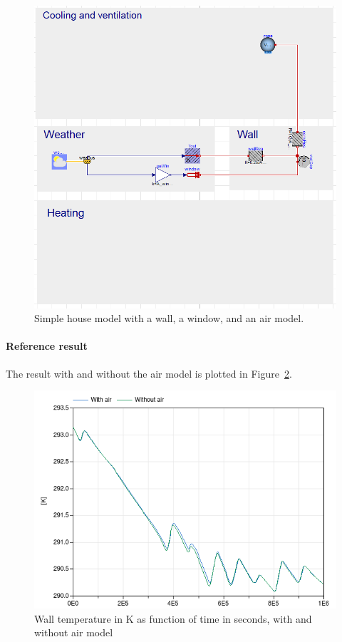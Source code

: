 \documentclass[10pt,a4paper]{article}
\begin{document}
 \begin{figure}[h!]
\centering
\includegraphics[scale=0.4]{airModel.png}
\caption{Simple house model with a wall, a window, and an air model.}
\label{fig:airModel}
\end{figure} 

\paragraph{Reference result}
The result with and without the air model
is plotted in Figure~\ref{fig:res3}.

 

\begin{figure}
\centering
\includegraphics[scale=0.6]{result3.png}
\caption{Wall temperature in K as function of time in seconds,
with and without air model}
\label{fig:res3}
\end{figure}
\end{document}
